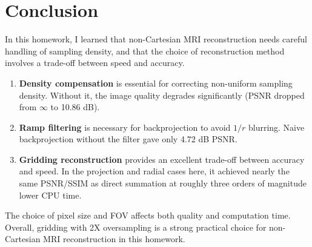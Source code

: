\section{Conclusion}
In this homework, I learned that non-Cartesian MRI reconstruction needs careful handling of sampling density, and that the choice of reconstruction method involves a trade-off between speed and accuracy.
\begin{enumerate}
  \item \textbf{Density compensation} is essential for correcting non-uniform sampling density. Without it, the image quality degrades significantly (PSNR dropped from $\infty$ to 10.86 dB).
  \item \textbf{Ramp filtering} is necessary for backprojection to avoid $1/r$ blurring. Naive backprojection without the filter gave only 4.72 dB PSNR.
  \item \textbf{Gridding reconstruction} provides an excellent trade-off between accuracy and speed. In the projection and radial cases here, it achieved nearly the same PSNR/SSIM as direct summation at roughly three orders of magnitude lower CPU time.
\end{enumerate}
The choice of pixel size and FOV affects both quality and computation time. Overall, gridding with 2X oversampling is a strong practical choice for non-Cartesian MRI reconstruction in this homework.
